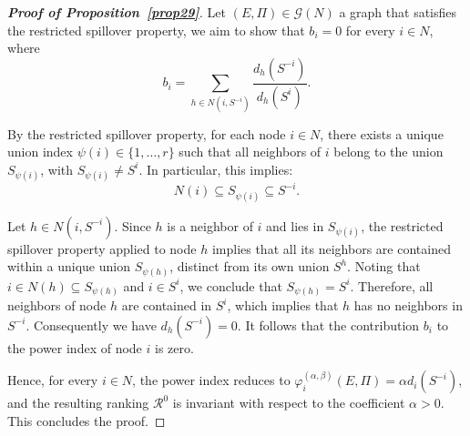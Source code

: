 \documentclass[preprint,11pt,authoryear]{elsarticle}
\theoremstyle{plain}
\begin{document}
\begin{proof}[\bf Proof of Proposition~\ref{prop29}]
	Let $(E,\Pi)\in\mathcal{G}(N)$ a graph that satisfies the restricted spillover property, we aim to show that \( b_i = 0 \) for every \( i \in N \), where
	\[
	b_i = \sum_{h \in N(i, S^{-i})} \frac{d_h(S^{-i})}{d_h(S^i)} .
	\]
	
	By the restricted spillover property, for each node \( i \in N \), there exists a unique union index \( \psi(i) \in \{1, \dots, r\} \) such that all neighbors of \( i \) belong to the union \( S_{\psi(i)} \), with \( S_{\psi(i)} \neq S^i \). In particular, this implies:
	\[
	N(i) \subseteq S_{\psi(i)} \subseteq S^{-i}.
	\]
	
	Let \( h \in N(i, S^{-i}) \). Since \( h \) is a neighbor of \( i \) and lies in \( S_{\psi(i)} \), the restricted spillover property applied to node \( h \) implies that all its neighbors are contained within a unique union \( S_{\psi(h)} \), distinct from its own union \( S^h \). 
	Noting that \( i \in N(h) \subseteq S_{\psi(h)} \) and \( i \in S^i \), we conclude that \( S_{\psi(h)} = S^i \). Therefore, all neighbors of node \( h \) are contained in \( S^i \), which implies that \( h \) has no neighbors in \( S^{-i} \). Consequently we have
	$d_h(S^{-i}) = 0.$ It follows that the contribution \( b_i \) to the power index of node \( i \) is zero.
	
	
	Hence, for every \( i \in N \), the power index reduces to \( \varphi_i^{(\alpha,\beta)}(E,\Pi) = \alpha d_i(S^{-i}) \), and the resulting ranking \( \mathcal{R}^0 \) is invariant with respect to the coefficient \( \alpha > 0 \). This concludes the proof.
\end{proof}
\end{document}
